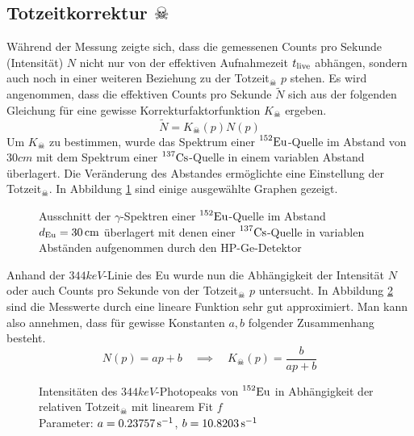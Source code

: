 
	\subsection{Totzeitkorrektur $\skull$}
	\label{ssec:totzeitkorrektur}

		Während der Messung zeigte sich, dass die gemessenen Counts pro Sekunde (Intensität) $N$ nicht nur von der effektiven Aufnahmezeit $t_{\mathrm{live}}$ abhängen, sondern auch noch in einer weiteren Beziehung zu der Totzeit$_{\skull}$ $p$ stehen.
		Es wird angenommen, dass die effektiven Counts pro Sekunde $\tilde{N}$ sich aus der folgenden Gleichung für eine gewisse Korrekturfaktorfunktion $K_\skull$ ergeben.
		\[
			\tilde{N} = K_\skull(p) N(p)
		\]
		Um $K_\skull$ zu bestimmen, wurde das Spektrum einer $\prescript{152}{}{\mathrm{Eu}}$-Quelle im Abstand von $30\unit{cm}$ mit dem Spektrum einer $\prescript{137}{}{\mathrm{Cs}}$-Quelle in einem variablen Abstand überlagert.
		Die Veränderung des Abstandes ermöglichte eine Einstellung der Totzeit$_\skull$.
		In Abbildung \ref{fig:totzeit} sind einige ausgewählte Graphen gezeigt.
	
		\begin{figure}[htb]
			\centering
			
			\caption{Ausschnitt der $\gamma$-Spektren einer $\prescript{152}{}{\mathrm{Eu}}$-Quelle im Abstand $d_{\mathrm{Eu}}=30\, \mathrm{cm}$ überlagert mit denen einer $\prescript{137}{}{\mathrm{Cs}}$-Quelle in variablen Abständen aufgenommen durch den HP-Ge-Detektor}
			\label{fig:totzeit}
		\end{figure}

		Anhand der $344\unit{keV}$-Linie des Eu wurde nun die Abhängigkeit der Intensität $N$ oder auch Counts pro Sekunde von der Totzeit$_\skull$ $p$ untersucht.
		In Abbildung \ref{fig:totzeit-k} sind die Messwerte durch eine lineare Funktion sehr gut approximiert.
		Man kann also annehmen, dass für gewisse Konstanten $a,b$ folgender Zusammenhang besteht.
		\[
			N(p) = ap+b \quad \implies \quad K_\skull(p) = \frac{b}{ap+b}
		\]

		\begin{figure}[htb]
			\centering
			
			\caption{Intensitäten des $344\unit{keV}$-Photopeaks von $\prescript{152}{}{\mathrm{Eu}}$ in Abhängigkeit der relativen Totzeit$_\skull$ mit linearem Fit $f$ \\ Parameter: $a=0.23757\, \mathrm{{s}^{-1}}$, $b=10.8203\, \mathrm{{s}^{-1}}$}
			\label{fig:totzeit-k}
		\end{figure}
		

